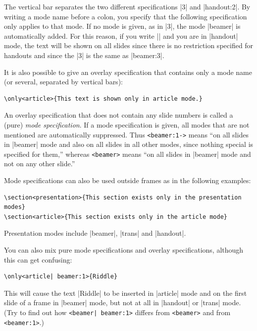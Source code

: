\begin{original...}
The vertical bar separates the two different specifications |3| and |handout:2|. By writing a mode name before a colon, you specify that the following specification only applies to that mode. If no mode is given, as in |3|, the mode |beamer| is automatically added. For this reason, if you write || and you are in |handout| mode, the text will be shown on all slides since there is no restriction specified for handouts and since the |3| is the same as |beamer:3|.

It is also possible to give an overlay specification that contains only a mode name (or several, separated by vertical bars):
\begin{Verbatim}
\only<article>{This text is shown only in article mode.}
\end{Verbatim}

An overlay specification that does not contain any slide numbers is called a (pure) \emph{mode specification}. If a mode specification is given, all modes that are not mentioned are automatically suppressed. Thus \Verb|<beamer:1->| means ``on all slides in |beamer| mode and also on all slides in all other modes, since nothing special is specified for them,'' whereas \Verb|<beamer>| means ``on all slides in |beamer| mode and not on any other slide.''

Mode specifications can also be used outside frames as in the following examples:
\begin{Verbatim}
\section<presentation>{This section exists only in the presentation modes}
\section<article>{This section exists only in the article mode}
\end{Verbatim}

Presentation modes include |beamer|, |trans| and |handout|.

You can also mix pure mode specifications and overlay specifications, although this can get confusing:
\begin{Verbatim}
\only<article| beamer:1>{Riddle}
\end{Verbatim}

This will cause the text |Riddle| to be inserted in |article| mode and on the first slide of a frame in |beamer| mode, but not at all in |handout| or |trans| mode. (Try to find out how \Verb/<beamer| beamer:1>/ differs from \Verb|<beamer>| and from \Verb|<beamer:1>|.)


\end{original...}
